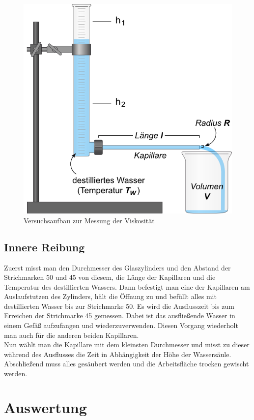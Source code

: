 \documentclass[12pt,a4paper,titlepage,headinclude,bibtotoc]{scrartcl}
\begin{document}
\begin{figure}[!htb]
	\centering
	\includegraphics[scale=0.6]{ViskoAufbau.png}
	\caption{Versuchsaufbau zur Messung der Viskosität \cite{lp}}
	\label{fig:Visko}
\end{figure}
\subsection{Innere Reibung}
Zuerst misst man den Durchmesser des Glaszylinders und den Abstand der Strichmarken 50 und 45 von diesem, die Länge der Kapillaren und die Temperatur des destillierten Wassers.
Dann befestigt man eine der Kapillaren am Auslaufstutzen des Zylinders, hält die Öffnung zu und befüllt alles mit destillierten Wasser bis zur Strichmarke 50.
Es wird die Ausflusszeit bis zum Erreichen der Strichmarke 45 gemessen.
Dabei ist das ausfließende Wasser in einem Gefäß aufzufangen und wiederzuverwenden.
Diesen Vorgang wiederholt man auch für die anderen beiden Kapillaren.\\
Nun wählt man die Kapillare mit dem kleinsten Durchmesser und misst zu dieser während des Ausflusses die Zeit in Abhängigkeit der Höhe der Wassersäule.\\
Abschließend muss alles gesäubert werden und die Arbeitsfläche trocken gewischt werden.

\section{Auswertung}
\label{sec:auswertung}
\end{document}
